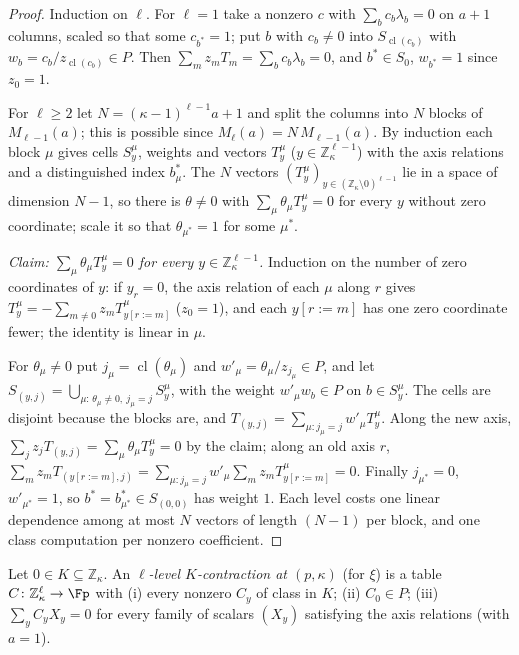 \begin{proof}
Induction on $\ell$. For $\ell = 1$ take a nonzero $c$ with $\sum_bc_b\lambda_b = 0$ on $a+1$ columns, scaled so that some $c_{b^\ast} = 1$; put $b$ with $c_b \ne 0$ into $S_{\operatorname{cl}(c_b)}$ with $w_b = c_b/z_{\operatorname{cl}(c_b)} \in P$. Then $\sum_mz_mT_m = \sum_bc_b\lambda_b = 0$, and $b^\ast \in S_0$, $w_{b^\ast} = 1$ since $z_0 = 1$.

For $\ell \ge 2$ let $N = (\kappa-1)^{\ell-1}a + 1$ and split the columns into $N$ blocks of $M_{\ell-1}(a)$; this is possible since $M_\ell(a) = N\,M_{\ell-1}(a)$. By induction each block $\mu$ gives cells $S^\mu_y$, weights and vectors $T^\mu_y$ ($y \in \mathbb{Z}_\kappa^{\ell-1}$) with the axis relations and a distinguished index $b^\ast_\mu$. The $N$ vectors $(T^\mu_y)_{y \in (\mathbb{Z}_\kappa\setminus0)^{\ell-1}}$ lie in a space of dimension $N-1$, so there is $\theta \ne 0$ with $\sum_\mu\theta_\mu T^\mu_y = 0$ for every $y$ without zero coordinate; scale it so that $\theta_{\mu^\ast} = 1$ for some $\mu^\ast$.

\emph{Claim: $\sum_\mu\theta_\mu T^\mu_y = 0$ for every $y \in \mathbb{Z}_\kappa^{\ell-1}$.} Induction on the number of zero coordinates of $y$: if $y_r = 0$, the axis relation of each $\mu$ along $r$ gives $T^\mu_y = -\sum_{m \ne 0}z_mT^\mu_{y[r:=m]}$ ($z_0 = 1$), and each $y[r:=m]$ has one zero coordinate fewer; the identity is linear in $\mu$.

For $\theta_\mu \ne 0$ put $j_\mu = \operatorname{cl}(\theta_\mu)$ and $w'_\mu = \theta_\mu/z_{j_\mu} \in P$, and let $S_{(y,j)} = \bigcup_{\mu:\,\theta_\mu \ne 0,\ j_\mu = j}S^\mu_y$, with the weight $w'_\mu w_b \in P$ on $b \in S^\mu_y$. The cells are disjoint because the blocks are, and $T_{(y,j)} = \sum_{\mu: j_\mu = j}w'_\mu T^\mu_y$. Along the new axis, $\sum_jz_jT_{(y,j)} = \sum_\mu\theta_\mu T^\mu_y = 0$ by the claim; along an old axis $r$, $\sum_mz_mT_{(y[r:=m],j)} = \sum_{\mu: j_\mu = j}w'_\mu\sum_mz_mT^\mu_{y[r:=m]} = 0$. Finally $j_{\mu^\ast} = 0$, $w'_{\mu^\ast} = 1$, so $b^\ast = b^\ast_{\mu^\ast} \in S_{(0,0)}$ has weight $1$. Each level costs one linear dependence among at most $N$ vectors of length $(N-1)$ per block, and one class computation per nonzero coefficient.
\end{proof}

\begin{definition}
\label{def:ell-contraction}
Let $0 \in K \subseteq \mathbb{Z}_\kappa$. An \emph{$\ell$-level $K$-contraction at $(p,\kappa)$} (for $\xi$) is a table $C\colon\mathbb{Z}_\kappa^\ell \to \Fp$ with
\textup{(i)} every nonzero $C_y$ of class in $K$; \textup{(ii)} $C_0 \in P$; \textup{(iii)} $\sum_yC_yX_y = 0$ for every family of scalars $(X_y)$ satisfying the axis relations (with $a = 1$).
\end{definition}


